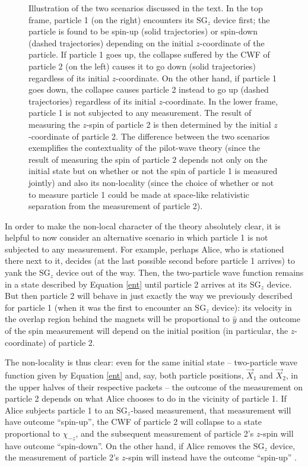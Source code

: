 \documentclass[aps,prc,onecolumn,letterpaper,floatfix,12pt]{revtex4}
\begin{document}
\begin{figure}[t]
\begin{center}
\scalebox{.9}{

}
\caption{
Illustration of the two scenarios discussed in the text.  In the top
frame, particle 1 (on the right) encounters its $\text{SG}_z$ device
first; the particle is found to be spin-up (solid trajectories) or
spin-down (dashed trajectories) depending on the initial $z$-coordinate of
the particle.  If particle 1 goes up, the collapse suffered
by the CWF of particle 2 (on the left) causes it to go down (solid
trajectories) regardless of its initial $z$-coordinate.  On the other
hand, if particle 1 goes down, the collapse causes particle
2 instead to go up (dashed trajectories) regardless of its initial
$z$-coordinate.  In the lower frame, particle 1 is not subjected to
any measurement.  The result of measuring the $z$-spin of particle 2
is then determined by the initial $z$-coordinate of particle 2.  The
difference between the two scenarios exemplifies the contextuality of
the pilot-wave theory (since the result of measuring the spin of
particle 2 depends not only on the initial state but on whether or not
the spin of particle 1 is measured jointly) and also its non-locality
(since the choice of whether or not to measure particle 1 could be
made at space-like relativistic separation from the measurement of
particle 2).  
\label{fig6}
}
\end{center}
\end{figure}


In order to make the non-local character of the theory absolutely
clear, it is helpful to now consider an alternative scenario in which 
particle 1 is not subjected to any measurement.  For example, perhaps
Alice, who is stationed there next to it, decides (at the last
possible second before particle 1 arrives) to yank the
$\text{SG}_z$ device out of the way.  Then, the two-particle wave
function remains in a state described by Equation \eqref{ent} until
particle 2 arrives at its $\text{SG}_z$ device.  But then particle 2
will behave in just exactly the way we previously described for
particle 1 (when it was the first to encounter an $\text{SG}_z$
device):  its velocity in the overlap region behind the magnets will
be proportional to $\hat{y}$ and the outcome of the spin measurement
will depend on the initial position (in particular, the
$z$-coordinate) of particle 2.  

The non-locality is thus clear:  even for the same initial state -- 
two-particle wave function given by Equation \eqref{ent} and, say, both
particle positions, $\vec{X}_1$ and $\vec{X}_2$, in the upper halves
of 
their respective packets -- the outcome of the measurement on particle 
2 depends on what Alice chooses to do in the
vicinity of particle 1.  If Alice subjects particle 1 to an
$\text{SG}_z$-based measurement, that measurement will have outcome
``spin-up'', the CWF of particle 2 will collapse
to a state proportional to $\chi_{-z}$, and the subsequent measurement
of particle 2's $z$-spin will have outcome ``spin-down''.  On the
other hand, if Alice removes the $\text{SG}_z$ device, the measurement
of particle 2's $z$-spin will instead have the outcome ``spin-up'' \cite{signaling}.
\end{document}
